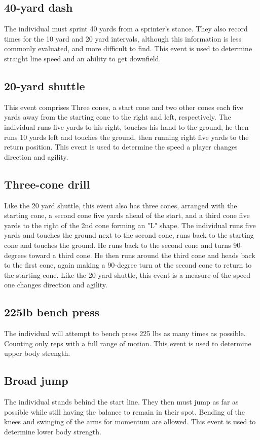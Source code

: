 \documentclass[confrence]{IEEEtran}
\begin{document}
\subsection*{40-yard dash}
The individual must sprint 40 yards from a sprinter's stance. They also record times for the 10 yard and 20 yard intervals, although this information is less commonly evaluated, and more difficult to find.
This event is used to determine straight line speed and an ability to get downfield.
\subsection*{20-yard shuttle}
This event comprises Three cones, a start cone and two other cones each five yards away from the starting cone to the right and left, respectively.
The individual runs five yards to his right, touches his hand to the ground, he then runs 10 yards left and touches the ground, then running right five yards to the return position.
This event is used to determine the speed a player changes direction and agility.
\subsection*{Three-cone drill}
Like the 20 yard shuttle, this event also has three cones, arranged with the starting cone, a second cone five yards ahead of the start, and a third cone five yards to the right of the 2nd cone forming an "L" shape.
The individual runs five yards and touches the ground next to the second cone, runs back to the starting cone and touches the ground.
He runs back to the second cone and turns 90-degrees toward a third cone.
He then runs around the third cone and heads back to the first cone, again making a 90-degree turn at the second cone to return to the starting cone.
Like the 20-yard shuttle, this event is a measure of the speed one changes direction and agility.
\subsection*{225lb bench press}
The individual will attempt to bench press 225 lbs as many times as possible.
Counting only reps with a full range of motion.
This event is used to determine upper body strength.
\subsection*{Broad jump}
The individual stands behind the start line.
They then must jump as far as possible while still having the balance to remain in their spot.
Bending of the knees and swinging of the arms for momentum are allowed.
This event is used to determine lower body strength.
\end{document}
